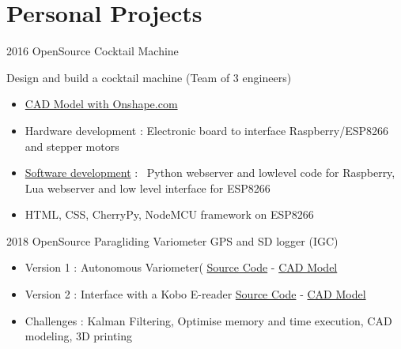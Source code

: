 \documentclass[a4paper]{friggeri-cv} %
\begin{document}

\section{Personal Projects}

\begin{entrylist}

\entry
{2016}
{ OpenSource Cocktail Machine }
{  }
{ Design and build a cocktail machine (Team of 3 engineers)
\begin{itemize}
\item \href{https://cad.onshape.com/documents/fb6038b2912b9dee202ae483/w/fca3360b8bc95b6a2f76da72/e/469430195367acaf31facc33}{CAD Model with Onshape.com}
\item { Hardware development : Electronic board to interface Raspberry/ESP8266 and stepper motors }
\item {\href{https://github.com/tilaktilak/Inebriator}{Software development} : \
Python webserver and lowlevel code for Raspberry, Lua webserver and low level interface for ESP8266}
\item {HTML, CSS, CherryPy, NodeMCU framework on ESP8266}
\end{itemize}
}

\entry
{2018}
{ OpenSource Paragliding Variometer GPS and SD logger (IGC) }
{  }
{
\begin{itemize}
\item Version 1 : Autonomous Variometer( \href{https://github.com/tilaktilak/variometre}{Source Code} - \href{https://cad.onshape.com/documents/a2edef2565390c2a63887be6/w/e115fc79a19f6ea7701f931d/e/4bf08f905543160a6d4a78ce}{CAD Model} 
\item Version 2 : Interface with a Kobo E-reader \href{https://github.com/tilaktilak/xcvario}{Source Code} - \href{https://cad.onshape.com/documents/e35f287762e7eb2639163738/w/944245d017b66dfac14ea554/e/e65c9aaedd3effabe6219e48}{CAD Model}
\item Challenges : Kalman Filtering, Optimise memory and time execution, CAD modeling, 3D printing
\end{itemize} 

}
\end{entrylist}
\end{document}
